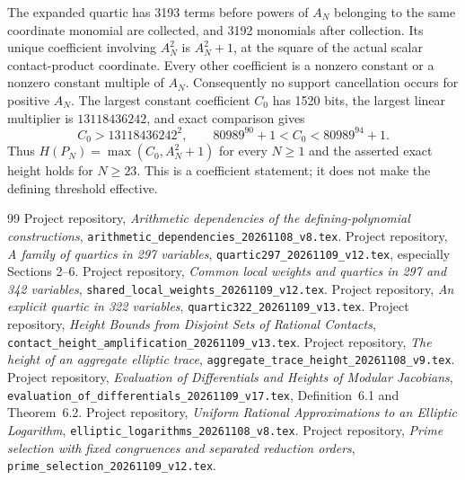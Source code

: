 \documentclass[11pt,a4paper]{article}
\begin{document}
The expanded quartic has 3193 terms before powers of $A_N$ belonging
to the same coordinate monomial are collected, and 3192 monomials
after collection. Its unique coefficient involving $A_N^2$ is
$A_N^2+1$, at the square of the actual scalar contact-product coordinate.
Every other coefficient is a nonzero constant or a nonzero constant
multiple of $A_N$. Consequently no support cancellation occurs for
positive $A_N$. The largest constant coefficient $C_0$ has 1520 bits,
the largest linear multiplier is $13118436242$, and exact comparison
gives
\[
 C_0>13118436242^2,\qquad
 80989^{90}+1<C_0<80989^{94}+1.
\]
Thus $H(P_N)=\max(C_0,A_N^2+1)$ for every $N\ge1$ and the asserted
exact height holds for $N\ge23$. This is a coefficient statement;
it does not make the defining threshold effective.

\begin{thebibliography}{99}\small\setlength{\itemsep}{2pt}
 Project repository,
\emph{Arithmetic dependencies of the defining-polynomial constructions},
\nolinkurl{arithmetic_dependencies_20261108_v8.tex}.
 Project repository,
\emph{A family of quartics in 297 variables},
\nolinkurl{quartic297_20261109_v12.tex}, especially Sections 2--6.
 Project repository,
\emph{Common local weights and quartics in 297 and 342 variables},
\nolinkurl{shared_local_weights_20261109_v12.tex}.
 Project repository,
\emph{An explicit quartic in 322 variables},
\nolinkurl{quartic322_20261109_v13.tex}.
 Project repository,
\emph{Height Bounds from Disjoint Sets of Rational Contacts},
\nolinkurl{contact_height_amplification_20261109_v13.tex}.
 Project repository,
\emph{The height of an aggregate elliptic trace},
\nolinkurl{aggregate_trace_height_20261108_v9.tex}.
 Project repository,
\emph{Evaluation of Differentials and Heights of Modular Jacobians},
\nolinkurl{evaluation_of_differentials_20261109_v17.tex},
Definition~6.1 and Theorem~6.2.
 Project repository,
\emph{Uniform Rational Approximations to an Elliptic Logarithm},
\nolinkurl{elliptic_logarithms_20261108_v8.tex}.
 Project repository,
\emph{Prime selection with fixed congruences and separated reduction orders},
\nolinkurl{prime_selection_20261109_v12.tex}.
\end{thebibliography}
\end{document}

